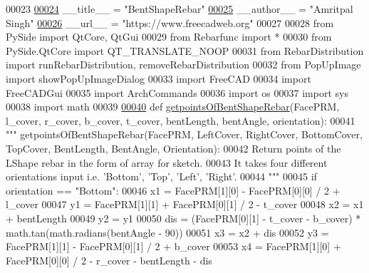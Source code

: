 \begin{DoxyCode}
00023 
\hypertarget{BentShapeRebar_8py_source.tex_l00024}{}\hyperlink{namespaceBentShapeRebar_a38b223debc1826fd2855773a02749bb4}{00024} \_\_title\_\_ = \textcolor{stringliteral}{"BentShapeRebar"}
\hypertarget{BentShapeRebar_8py_source.tex_l00025}{}\hyperlink{namespaceBentShapeRebar_ad79a2dbf88601c24aae561033cb48d34}{00025} \_\_author\_\_ = \textcolor{stringliteral}{"Amritpal Singh"}
\hypertarget{BentShapeRebar_8py_source.tex_l00026}{}\hyperlink{namespaceBentShapeRebar_aec768ca6a259d1cc738ea11c79a124e2}{00026} \_\_url\_\_ = \textcolor{stringliteral}{"https://www.freecadweb.org"}
00027 
00028 \textcolor{keyword}{from} PySide \textcolor{keyword}{import} QtCore, QtGui
00029 \textcolor{keyword}{from} Rebarfunc \textcolor{keyword}{import} *
00030 \textcolor{keyword}{from} PySide.QtCore \textcolor{keyword}{import} QT\_TRANSLATE\_NOOP
00031 \textcolor{keyword}{from} RebarDistribution \textcolor{keyword}{import} runRebarDistribution, removeRebarDistribution
00032 \textcolor{keyword}{from} PopUpImage \textcolor{keyword}{import} showPopUpImageDialog
00033 \textcolor{keyword}{import} FreeCAD
00034 \textcolor{keyword}{import} FreeCADGui
00035 \textcolor{keyword}{import} ArchCommands
00036 \textcolor{keyword}{import} os
00037 \textcolor{keyword}{import} sys
00038 \textcolor{keyword}{import} math
00039 
\hypertarget{BentShapeRebar_8py_source.tex_l00040}{}\hyperlink{namespaceBentShapeRebar_a33951a8ab21a73bae42af9f81d7c43c3}{00040} \textcolor{keyword}{def }\hyperlink{namespaceBentShapeRebar_a33951a8ab21a73bae42af9f81d7c43c3}{getpointsOfBentShapeRebar}(FacePRM, l\_cover, r\_cover, b\_cover, t\_cover, 
      bentLength, bentAngle, orientation):
00041     \textcolor{stringliteral}{""" getpointsOfBentShapeRebar(FacePRM, LeftCover, RightCover, BottomCover, TopCover, BentLength,
       BentAngle, Orientation):}
00042 \textcolor{stringliteral}{    Return points of the LShape rebar in the form of array for sketch.}
00043 \textcolor{stringliteral}{    It takes four different orientations input i.e. 'Bottom', 'Top', 'Left', 'Right'.}
00044 \textcolor{stringliteral}{    """}
00045     \textcolor{keywordflow}{if} orientation == \textcolor{stringliteral}{"Bottom"}:
00046         x1 = FacePRM[1][0] - FacePRM[0][0] / 2 + l\_cover
00047         y1 = FacePRM[1][1] + FacePRM[0][1] / 2 - t\_cover
00048         x2 = x1 + bentLength
00049         y2 = y1
00050         dis = (FacePRM[0][1] - t\_cover - b\_cover) * math.tan(math.radians(bentAngle - 90))
00051         x3 = x2 + dis
00052         y3 = FacePRM[1][1] - FacePRM[0][1] / 2 + b\_cover
00053         x4 = FacePRM[1][0] + FacePRM[0][0] / 2 - r\_cover - bentLength - dis

\end{DoxyCode}
